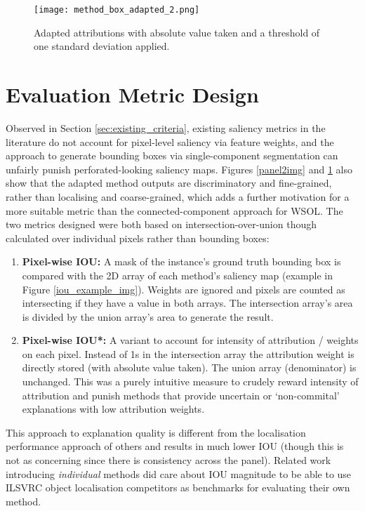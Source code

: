 \documentclass[main]{subfiles}
\begin{document}
\begin{figure}[htbp]
\centering
\texttt{[image: method\_box\_adapted\_2.png]}
\caption{Adapted attributions with absolute value taken and a threshold of one standard deviation applied.}
\label{panel3img}
\end{figure}


\newpage


\section{Evaluation Metric Design} \label{sec:metric}

Observed in Section \ref{sec:existing_criteria}, existing saliency metrics in the literature do not account for pixel-level saliency via feature weights, and the approach to generate bounding boxes via single-component segmentation can unfairly punish perforated-looking saliency maps. Figures \ref{panel2img} and \ref{panel3img} also show that the adapted method outputs are discriminatory and fine-grained, rather than localising and coarse-grained, which adds a further motivation for a more suitable metric than the connected-component approach for WSOL. The two metrics designed were both based on intersection-over-union though calculated over individual pixels rather than bounding boxes:

\begin{enumerate}
\item \textbf{Pixel-wise IOU:} A mask of the instance's ground truth bounding box is compared with the 2D array of each method's saliency map (example in Figure \ref{iou_example_img}). Weights are ignored and pixels are counted as intersecting if they have a value in both arrays. The intersection array's area is divided by the union array's area to generate the result.

\item \textbf{Pixel-wise IOU*:} A variant to account for intensity of attribution / weights on each pixel. Instead of 1s in the intersection array the attribution weight is directly stored (with absolute value taken). The union array (denominator) is unchanged. This was a purely intuitive measure to crudely reward intensity of attribution and punish methods that provide uncertain or `non-commital' explanations with low attribution weights.

\end{enumerate}

This approach to explanation quality is different from the localisation performance approach of others and results in much lower IOU (though this is not as concerning since there is consistency across the panel). Related work introducing \textit{individual} methods did care about IOU magnitude to be able to use ILSVRC object localisation competitors as benchmarks for evaluating their own method.
\end{document}
